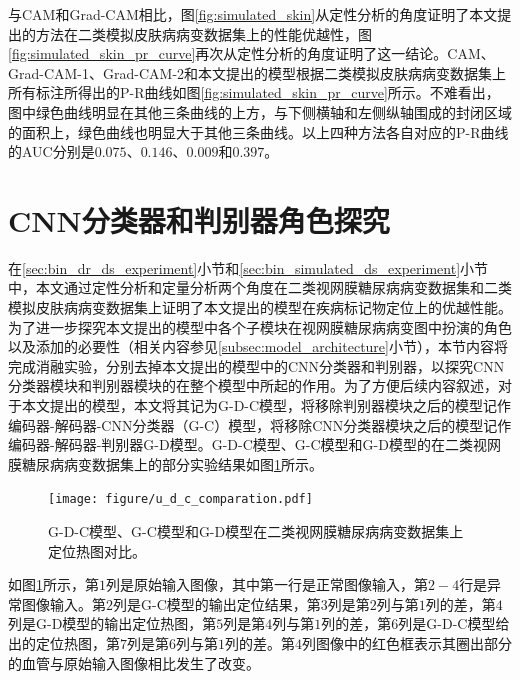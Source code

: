 与CAM和Grad-CAM相比，图\ref{fig:simulated_skin}从定性分析的角度证明了本文提出的方法在二类模拟皮肤病病变数据集上的性能优越性，图\ref{fig:simulated_skin_pr_curve}再次从定性分析的角度证明了这一结论。CAM、Grad-CAM-1、Grad-CAM-2和本文提出的模型根据二类模拟皮肤病病变数据集上所有标注所得出的P-R曲线如图\ref{fig:simulated_skin_pr_curve}所示。不难看出，图中绿色曲线明显在其他三条曲线的上方，与下侧横轴和左侧纵轴围成的封闭区域的面积上，绿色曲线也明显大于其他三条曲线。以上四种方法各自对应的P-R曲线的AUC分别是$0.075$、$0.146$、$0.009$和$0.397$。
\section{CNN分类器和判别器角色探究}\label{sec:g_c_g_d_g_d_c_comparsion}
在\ref{sec:bin_dr_ds_experiment}小节和\ref{sec:bin_simulated_ds_experiment}小节中，本文通过定性分析和定量分析两个角度在二类视网膜糖尿病病变数据集和二类模拟皮肤病病变数据集上证明了本文提出的模型在疾病标记物定位上的优越性能。为了进一步探究本文提出的模型中各个子模块在视网膜糖尿病病变图中扮演的角色以及添加的必要性（相关内容参见\ref{subsec:model_architecture}小节），本节内容将完成消融实验，分别去掉本文提出的模型中的CNN分类器和判别器，以探究CNN分类器模块和判别器模块的在整个模型中所起的作用。为了方便后续内容叙述，对于本文提出的模型，本文将其记为G-D-C模型，将移除判别器模块之后的模型记作编码器-解码器-CNN分类器（G-C）模型，将移除CNN分类器模块之后的模型记作编码器-解码器-判别器G-D模型。G-D-C模型、G-C模型和G-D模型的在二类视网膜糖尿病病变数据集上的部分实验结果如图\ref{fig:u_d_c_comparation}所示。
\begin{figure}[h]
	\centering
	\texttt{[image: figure/u\_d\_c\_comparation.pdf]}
	\caption[G-D-C模型、G-C模型和G-D模型定位热图对比]{G-D-C模型、G-C模型和G-D模型在二类视网膜糖尿病病变数据集上定位热图对比。} 
	\label{fig:u_d_c_comparation}
\end{figure}

如图\ref{fig:u_d_c_comparation}所示，第$1$列是原始输入图像，其中第一行是正常图像输入，第$2-4$行是异常图像输入。第$2$列是G-C模型的输出定位结果，第$3$列是第$2$列与第$1$列的差，第$4$列是G-D模型的输出定位热图，第$5$列是第$4$列与第$1$列的差，第$6$列是G-D-C模型给出的定位热图，第$7$列是第$6$列与第$1$列的差。第$4$列图像中的红色框表示其圈出部分的血管与原始输入图像相比发生了改变。

